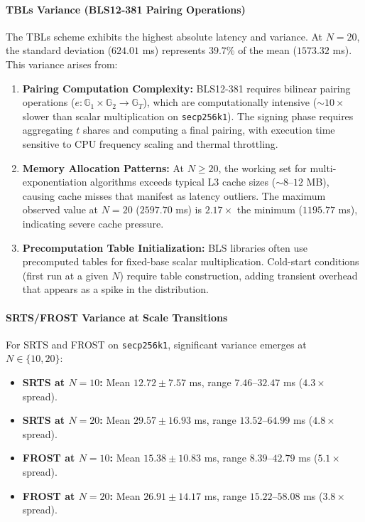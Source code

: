 \paragraph{TBLs Variance (BLS12-381 Pairing Operations)}
The TBLs scheme exhibits the highest absolute latency and variance. At $N=20$, the standard deviation ($624.01$ ms) represents $39.7\%$ of the mean ($1573.32$ ms). This variance arises from:
\begin{enumerate}
    \item \textbf{Pairing Computation Complexity:} BLS12-381 requires bilinear pairing operations ($e: \mathbb{G}_1 \times \mathbb{G}_2 \to \mathbb{G}_T$), which are computationally intensive ($\sim 10\times$ slower than scalar multiplication on \texttt{secp256k1}). The signing phase requires aggregating $t$ shares and computing a final pairing, with execution time sensitive to CPU frequency scaling and thermal throttling.
    \item \textbf{Memory Allocation Patterns:} At $N \geq 20$, the working set for multi-exponentiation algorithms exceeds typical L3 cache sizes ($\sim 8$--$12$ MB), causing cache misses that manifest as latency outliers. The maximum observed value at $N=20$ ($2597.70$ ms) is $2.17\times$ the minimum ($1195.77$ ms), indicating severe cache pressure.
    \item \textbf{Precomputation Table Initialization:} BLS libraries often use precomputed tables for fixed-base scalar multiplication. Cold-start conditions (first run at a given $N$) require table construction, adding transient overhead that appears as a spike in the distribution.
\end{enumerate}

\paragraph{SRTS/FROST Variance at Scale Transitions}
For SRTS and FROST on \texttt{secp256k1}, significant variance emerges at $N \in \{10, 20\}$:
\begin{itemize}
    \item \textbf{SRTS at $N=10$:} Mean $12.72 \pm 7.57$ ms, range $7.46$--$32.47$ ms ($4.3\times$ spread).
    \item \textbf{SRTS at $N=20$:} Mean $29.57 \pm 16.93$ ms, range $13.52$--$64.99$ ms ($4.8\times$ spread).
    \item \textbf{FROST at $N=10$:} Mean $15.38 \pm 10.83$ ms, range $8.39$--$42.79$ ms ($5.1\times$ spread).
    \item \textbf{FROST at $N=20$:} Mean $26.91 \pm 14.17$ ms, range $15.22$--$58.08$ ms ($3.8\times$ spread).
\end{itemize}

